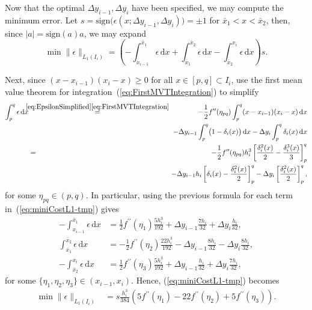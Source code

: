 \documentclass[a4paper,english]{IEEEtran}
\begin{document}
Now that the optimal $\Delta y_{i-1},\Delta y_{i}$ have been specified,
we may compute the minimum error. Let $s={\text{sign}}\bigl(\epsilon(x;\Delta y_{i-1},\Delta y_{i})\bigr)=\pm1$
for $\bar{x}_{1}<x<\bar{x}_{2}$, then, since $|a|={\text{sign}}(a)a$,
we may expand
\begin{equation}
\min\|\epsilon\|_{{L_{1}}(I_{i})}=\left(-\int_{x_{i-1}}^{\bar{x}_{1}}\epsilon\,{\mathrm{d}} x+\int_{\bar{x}_{1}}^{\bar{x}_{2}}\epsilon\,{\mathrm{d}} x-\int_{\bar{x}_{2}}^{x_{i}}\epsilon\,{\mathrm{d}} x\right)s.\label{eq:miniCostL1-tmp}
\end{equation}

Next, since $(x-x_{i-1})(x_{i}-x)\geq0$ for all $x\in[p,q]\subset I_{i}$,
use the first mean value theorem for integration~(\ref{eq:FirstMVTIntegration})
to simplify
\begin{eqnarray*}
\int_{p}^{q}\epsilon\,{\mathrm{d}} x & \!\!\!\!\stackrel{\eqref{eq:EpsilonSimplified}\eqref{eq:FirstMVTIntegration}}{=}\!\!\!\! & -\frac{1}{2}{{f}^{\prime\prime}}(\eta_{pq})\int_{p}^{q}(x-x_{i-1})(x_{i}-x)\,{\mathrm{d}} x\\
 &  & -\Delta y_{i-1}\int_{p}^{q}\bigl(1-\delta_{i}(x)\bigr)\,{\mathrm{d}} x-\Delta y_{i}\int_{p}^{q}\delta_{i}(x)\,{\mathrm{d}} x\\
 & = & -\frac{1}{2}{{f}^{\prime\prime}}(\eta_{pq})h_{i}^{3}\left[\frac{\delta_{i}^{2}(x)}{2}-\frac{\delta_{i}^{3}(x)}{3}\right]_{p}^{q}\\
 &  & -\Delta y_{i-1}h_{i}\left[\delta_{i}(x)-\frac{\delta_{i}^{2}(x)}{2}\right]_{p}^{q}-\Delta y_{i}\left[\frac{\delta_{i}^{2}(x)}{2}\right]_{p}^{q},
\end{eqnarray*}
for some $\eta_{pq}\in(p,q)$. In particular, using the previous formula
for each term in~(\ref{eq:miniCostL1-tmp}) gives
\begin{align*}
-\int_{x_{i-1}}^{\bar{x}_{1}}\epsilon\,{\mathrm{d}} x & =\frac{1}{2}{{f}^{\prime\prime}}(\eta_{1})\frac{5h_{i}^{3}}{192}+\Delta y_{i-1}\frac{7h_{i}}{32}+\Delta y_{i}\frac{h_{i}}{32},\\
\int_{\bar{x}_{1}}^{\bar{x}_{2}}\epsilon\,{\mathrm{d}} x & =-\frac{1}{2}{{f}^{\prime\prime}}(\eta_{2})\frac{22h_{i}^{3}}{192}-\Delta y_{i-1}\frac{8h_{i}}{32}-\Delta y_{i}\frac{8h_{i}}{32},\\
-\int_{\bar{x}_{2}}^{x_{i}}\epsilon\,{\mathrm{d}} x & =\frac{1}{2}{{f}^{\prime\prime}}(\eta_{3})\frac{5h_{i}^{3}}{192}+\Delta y_{i-1}\frac{h_{i}}{32}+\Delta y_{i}\frac{7h_{i}}{32},
\end{align*}
for some $\{\eta_{1},\eta_{2},\eta_{3}\}\in(x_{i-1},x_{i})$. Hence,
(\ref{eq:miniCostL1-tmp}) becomes
\begin{align*}
\min\|\epsilon\|_{{L_{1}}(I_{i})} & =s\frac{h_{i}^{3}}{384}\left(5{{f}^{\prime\prime}}(\eta_{1})-22{{f}^{\prime\prime}}(\eta_{2})+5{{f}^{\prime\prime}}(\eta_{3})\right).
\end{align*}
\end{document}
